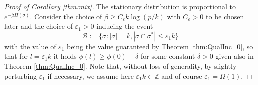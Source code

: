 \documentclass[12pt,reqno]{amsart}
\numberwithin{equation}{section}
\theoremstyle{definition}
\renewcommand{\epsilon}{\varepsilon}
\renewcommand{\P}{\mathbb{P}}
\newcommand{\conv}[1]{\overset{#1}{\rightarrow}}
\renewcommand{\[}{\begin{equation}}
\renewcommand{\]}{\end{equation}}
\newcommand{\scr}{\mathcal}
\renewcommand{\|}{\bigg{|}}
\begin{document}
\begin{proof}[Proof of Corollary \ref{thm:mix}]
The stationary distribution is proportional to $e^{-\beta H(\sigma)}$. Consider the choice of $\beta \geq  C_{\epsilon}k\log(p/k)$ with $C_{\epsilon} > 0$ to be chosen later and the choice of $\epsilon_1 > 0$ inducing the event \[\scr{B} := \{\sigma: |\sigma| = k ,  |\sigma \cap \sigma^*| \leq \epsilon_1 k\}\]with the value of $\epsilon_1$ being the value guaranteed by Theorem \ref{thm:QualInc_0}, so that for $l =\epsilon_1 k$ it holds $\phi(l)\geq \phi(0)+\delta$ for some constant $\delta>0$ given also in Theorem \ref{thm:QualInc_0}. Note that, without loss of generality, by slightly perturbing $\epsilon_1$ if necessary, we assume here $\epsilon_1 k \in \mathbb{Z}$ and of course $\epsilon_1=\Omega(1).$







\end{proof}
\end{document}
